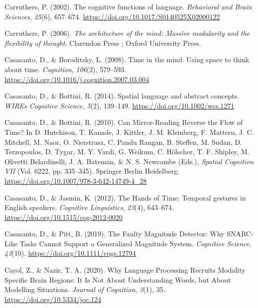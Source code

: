 \documentclass[
  a4paper,12pt,twoside,onecolumn,openright,final,oldfontcommands]{memoir}
\newlength{\cslhangindent}
\newlength{\cslentryspacingunit} %
\newenvironment{CSLReferences}[2] %
 {%
  \setlength{\parindent}{0pt}
  \ifodd #1
  \let\oldpar\par
  \def\par{\hangindent=\cslhangindent\oldpar}
  \fi
  \setlength{\parskip}{#2\cslentryspacingunit}
 }%
 {}
\begin{document}
\begin{CSLReferences}{1}{0}
\leavevmode{}%
Carruthers, P. (2002). The cognitive functions of language. \emph{Behavioral and Brain Sciences}, \emph{25}(6), 657--674. \url{https://doi.org/10.1017/S0140525X02000122}

\leavevmode{}%
Carruthers, P. (2006). \emph{The architecture of the mind: Massive modularity and the flexibility of thought}. Clarendon Press ; Oxford University Press.

\leavevmode{}%
Casasanto, D., \& Boroditsky, L. (2008). Time in the mind: {Using} space to think about time. \emph{Cognition}, \emph{106}(2), 579--593. \url{https://doi.org/10.1016/j.cognition.2007.03.004}

\leavevmode{}%
Casasanto, D., \& Bottini, R. (2014). Spatial language and abstract concepts. \emph{WIREs Cognitive Science}, \emph{5}(2), 139--149. \url{https://doi.org/10.1002/wcs.1271}

\leavevmode{}%
Casasanto, D., \& Bottini, R. (2010). Can {Mirror}-{Reading} {Reverse} the {Flow} of {Time}? In D. Hutchison, T. Kanade, J. Kittler, J. M. Kleinberg, F. Mattern, J. C. Mitchell, M. Naor, O. Nierstrasz, C. Pandu Rangan, B. Steffen, M. Sudan, D. Terzopoulos, D. Tygar, M. Y. Vardi, G. Weikum, C. Hölscher, T. F. Shipley, M. Olivetti Belardinelli, J. A. Bateman, \& N. S. Newcombe (Eds.), \emph{Spatial {Cognition} {VII}} (Vol. 6222, pp. 335--345). Springer Berlin Heidelberg. \url{https://doi.org/10.1007/978-3-642-14749-4_28}

\leavevmode{}%
Casasanto, D., \& Jasmin, K. (2012). The {Hands} of {Time}: {Temporal} gestures in {English} speakers. \emph{Cognitive Linguistics}, \emph{23}(4), 643--674. \url{https://doi.org/10.1515/cog-2012-0020}

\leavevmode{}%
Casasanto, D., \& Pitt, B. (2019). The {Faulty} {Magnitude} {Detector}: {Why} {SNARC}‐{Like} {Tasks} {Cannot} {Support} a {Generalized} {Magnitude} {System}. \emph{Cognitive Science}, \emph{43}(10). \url{https://doi.org/10.1111/cogs.12794}

\leavevmode{}%
Cayol, Z., \& Nazir, T. A. (2020). Why {Language} {Processing} {Recruits} {Modality} {Specific} {Brain} {Regions}: {It} {Is} {Not} {About} {Understanding} {Words}, but {About} {Modelling} {Situations}. \emph{Journal of Cognition}, \emph{3}(1), 35. \url{https://doi.org/10.5334/joc.124}


\end{CSLReferences}
\end{document}
